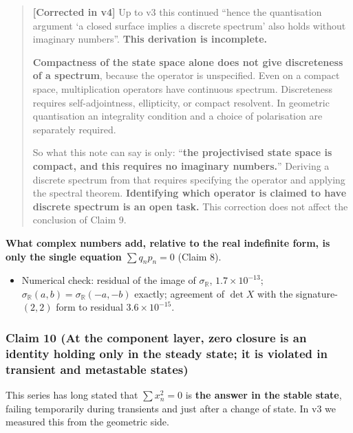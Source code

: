 \documentclass[
  10pt,
]{article}
\providecommand{\tightlist}{%
  \setlength{\itemsep}{0pt}\setlength{\parskip}{0pt}}
\begin{document}
\begin{quote}
\textbf{{[}Corrected in v4{]}} Up to v3 this continued ``hence the
quantisation argument `a closed surface implies a discrete spectrum'
also holds without imaginary numbers''. \textbf{This derivation is
incomplete.}

\textbf{Compactness of the state space alone does not give discreteness
of a spectrum}, because the operator is unspecified. Even on a compact
space, multiplication operators have continuous spectrum. Discreteness
requires self-adjointness, ellipticity, or compact resolvent. In
geometric quantisation an integrality condition and a choice of
polarisation are separately required.

So what this note can say is only: ``\textbf{the projectivised state
space is compact, and this requires no imaginary numbers.}'' Deriving a
discrete spectrum from that requires specifying the operator and
applying the spectral theorem. \textbf{Identifying which operator is
claimed to have discrete spectrum is an open task.} This correction does
not affect the conclusion of Claim 9.
\end{quote}

\textbf{What complex numbers add, relative to the real indefinite form,
is only the single equation \(\sum q_np_n = 0\)} (Claim 8).

\begin{itemize}
\tightlist
\item
  Numerical check: residual of the image of \(\sigma_{\mathbb{R}}\),
  \(1.7\times10^{-13}\);
  \(\sigma_{\mathbb{R}}(a,b)=\sigma_{\mathbb{R}}(-a,-b)\) exactly;
  agreement of \(\det X\) with the signature-\((2,2)\) form to residual
  \(3.6\times10^{-15}\).
\end{itemize}

\subsubsection{Claim 10 (At the component layer, zero closure is an
identity holding only in the steady state; it is violated in transient
and metastable
states)}\label{claim-10-at-the-component-layer-zero-closure-is-an-identity-holding-only-in-the-steady-state-it-is-violated-in-transient-and-metastable-states}

This series has long stated that \(\sum x_n^2 = 0\) is \textbf{the
answer in the stable state}, failing temporarily during transients and
just after a change of state. In v3 we measured this from the geometric
side.
\end{document}
